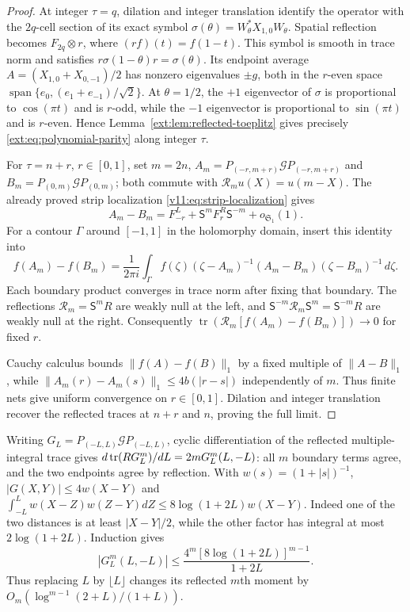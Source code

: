 \begin{proof}
At integer $\tau=q$, dilation and integer translation identify the
operator with the $2q$-cell section of its exact symbol
$\sigma(\theta)=W_\theta^*X_{1,0}W_\theta$.
Spatial reflection becomes $F_{2q}\otimes r$, where
$(rf)(t)=f(1-t)$.  This symbol is smooth in trace norm and satisfies
$r\sigma(1-\theta)r=\sigma(\theta)$.
Its endpoint average
$A=(X_{1,0}+X_{0,-1})/2$ has nonzero eigenvalues $\pm g$,
both in the $r$-even space
$\operatorname{span}\{e_0,(e_1+e_{-1})/\sqrt2\}$.
At $\theta=1/2$, the $+1$ eigenvector of $\sigma$ is proportional
to $\cos(\pi t)$ and is $r$-odd, while the $-1$ eigenvector is
proportional to $\sin(\pi t)$ and is $r$-even.  Hence
Lemma~\ref{ext:lem:reflected-toeplitz} gives precisely
\eqref{ext:eq:polynomial-parity} along integer $\tau$.

For $\tau=n+r$, $r\in[0,1]$, set $m=2n$,
$A_m=P_{(-r,m+r)}\mathcal G P_{(-r,m+r)}$ and
$B_m=P_{(0,m)}\mathcal G P_{(0,m)}$; both commute with
$\mathscr R_m u(X)=u(m-X)$. The already proved strip localization
\eqref{v11:eq:strip-localization} gives
\[
 A_m-B_m=F_{-r}^L+\mathsf S^mF_r^R\mathsf S^{-m}+o_{\mathfrak S_1}(1).
\]
For a contour $\Gamma$ around $[-1,1]$ in the holomorphy domain, insert
this identity into
\[
 f(A_m)-f(B_m)=\frac1{2\pi i}\int_\Gamma f(\zeta)
 (\zeta-A_m)^{-1}(A_m-B_m)(\zeta-B_m)^{-1}\,d\zeta.
\]
Each boundary product converges in trace norm after fixing that
boundary.  The reflections $\mathscr R_m=\mathsf S^mR$ are weakly null
at the left, and $\mathsf S^{-m}\mathscr R_m\mathsf S^m=\mathsf S^{-m}R$ are weakly null
at the right.  Consequently
$\operatorname{tr}(\mathscr R_m[f(A_m)-f(B_m)])\to0$ for fixed $r$.

Cauchy calculus bounds $\|f(A)-f(B)\|_1$ by a fixed multiple of
$\|A-B\|_1$, while
$\|A_m(r)-A_m(s)\|_1\le4b(|r-s|)$ independently of $m$.
Thus finite nets give uniform convergence on $r\in[0,1]$.
Dilation and integer translation recover the reflected traces at $n+r$
and $n$, proving the full limit.
\end{proof}

\begin{remark}
Writing $G_L=P_{(-L,L)}\mathcal G P_{(-L,L)}$, cyclic differentiation
of the reflected multiple-integral trace gives
$d\operatorname{tr}(RG_L^m)/dL=2mG_L^m(L,-L)$: all $m$ boundary terms agree,
and the two endpoints agree by reflection. With $w(s)=(1+|s|)^{-1}$,
$|G(X,Y)|\le4w(X-Y)$ and
$\int_{-L}^Lw(X-Z)w(Z-Y)dZ\le8\log(1+2L)w(X-Y)$.
Indeed one of the two distances is at least $|X-Y|/2$, while the
other factor has integral at most $2\log(1+2L)$. Induction gives
\[
 |G_L^m(L,-L)|\le\frac{4^m[8\log(1+2L)]^{m-1}}{1+2L}.
\]
Thus replacing $L$ by $\lfloor L\rfloor$ changes its reflected
$m$th moment by $O_m(\log^{m-1}(2+L)/(1+L))$.
\end{remark}

